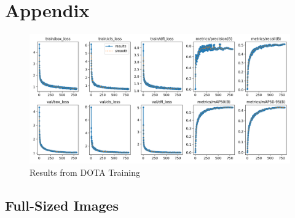 \chapter{Appendix}


\begin{figure}[h]
    \centering
    \includegraphics[width=\textwidth]{images/DOTA_train_res.png}
    \caption{Results from \acrshort{DOTA} Training}
    \label{fig:DOTA_train_values}
\end{figure}

\section{Full-Sized Images}

